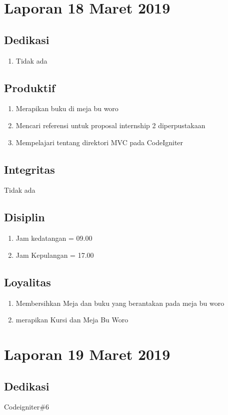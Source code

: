 \section{Laporan 18 Maret 2019}
\subsection{Dedikasi}
\begin{enumerate}
\item Tidak ada
\end{enumerate}
\subsection{Produktif}
\begin{enumerate}
\item Merapikan buku di meja bu woro
\item Mencari referensi untuk proposal internship 2 diperpustakaan
\item Mempelajari tentang direktori MVC pada CodeIgniter
\end{enumerate}
\subsection{Integritas}
Tidak ada
\subsection{Disiplin}
\begin{enumerate}
\item Jam kedatangan =  09.00
\item Jam Kepulangan = 17.00
\end{enumerate}
\subsection{Loyalitas}
\begin{enumerate}
\item Membersihkan Meja dan buku yang berantakan pada meja bu woro
\item merapikan Kursi dan Meja Bu Woro
\end{enumerate}


\section{Laporan 19 Maret 2019}
\subsection{Dedikasi}
Codeigniter\#6
